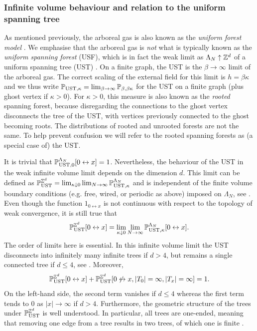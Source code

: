 \documentclass[11pt]{amsart}
\numberwithin{equation}{section}
\numberwithin{theorem}{section}
\newcommand{\conn}{\leftrightarrow}
\newcommand{\nconn}{\not\leftrightarrow}
\newcommand{\1}{{\bf 1}}
\begin{document}
\subsubsection*{Infinite volume behaviour and relation to the uniform spanning tree}

As mentioned previously, the arboreal gas is also known as the
\emph{uniform forest model} \cite{MR2243761}. We emphasise that the
arboreal gas is \emph{not} what is typically known as the
\emph{uniform spanning forest} (USF), which is in fact the weak limit
as $\Lambda_N \uparrow \Z^d$ of a uniform spanning tree (UST)
\cite{MR1127715}.  On a finite graph, the UST is the $\beta\to \infty$
limit of the arboreal gas. The correct scaling of the external field
for this limit is $h=\beta \kappa$ and we thus write
$\P_{\text{UST},\kappa} = \lim_{\beta\to\infty}
\P_{\beta,\beta\kappa}$ for the UST on a finite graph (plus ghost
vertex if $\kappa>0$).  For $\kappa>0$, this measure is also known as
the \emph{rooted} spanning forest, because disregarding the
connections to the ghost vertex disconnects the tree of the UST, with
vertices previously connected to the ghost becoming roots.  The
distributions of rooted and unrooted forests are not the same. To
help prevent confusion we will refer to the rooted spanning
forests as (a special case of) the UST.


It is trivial that $\P_{\text{UST},0}^{\Lambda_N}[0\conn x]=1$.
Nevertheless, the behaviour of the UST in the weak infinite volume limit depends
on the dimension $d$.
This limit can be defined as
$\P_{\rm UST}^{\Z^d} =\lim_{\kappa \downarrow 0}\lim_{N\to\infty}
\P_{\text{UST},\kappa}^{\Lambda_N}$
and is independent of
the finite volume boundary conditions (e.g. free, wired, or periodic as above)
imposed on $\Lambda_N$, see \cite{MR1127715}. Even though the function
$1_{0\conn x}$ is not continuous with respect to the topology of weak
convergence, it is still true that
\begin{equation}
  \P_{{\rm UST}}^{\Z^d}[0\conn x] = \lim_{\kappa \downarrow 0}\lim_{N\to\infty}
  \P_{{\rm UST},\kappa}^{\Lambda_N}[0 \conn x].
\end{equation} 
The order of limits here is essential.  In this infinite volume limit
the UST disconnects into infinitely many infinite trees if $d>4$, but
remains a single connected tree if $d\leq 4$, see \cite{MR1127715}.
Moreover,
\begin{equation}
  \P_{\rm UST}^{\Z^d}[0 \conn x] + \P_{\rm UST}^{\Z^d}[0\nconn x,
  |T_0|=\infty, |T_x|=\infty] = 1. 
\end{equation}
On the left-hand side, the second term vanishes if $d\leq 4$ whereas  the first term tends to $0$ as $|x|\to\infty$ if $d>4$.
Furthermore, the geometric structure of the trees under $\P_{\rm UST}^{\Z^d}$ is well understood.
In particular, all trees are one-ended, meaning that
removing one edge from a tree results in two trees, of which one is finite
\cite{MR1127715,MR1825141}.
\end{document}
